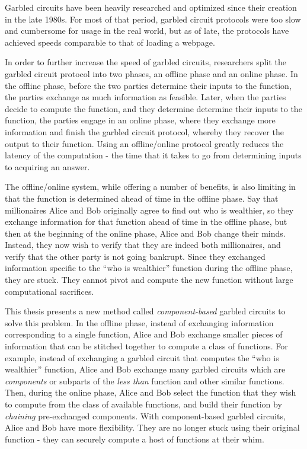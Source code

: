 Garbled circuits have been heavily researched and optimized since their creation in the late 1980s.
For most of that period, garbled circuit protocols were too slow and cumbersome for usage in the real world, but as of late, the protocols have achieved speeds comparable to that of loading a webpage. 

In order to further increase the speed of garbled circuits, researchers split the garbled circuit protocol into two phases, an offline phase and an online phase.
In the offline phase, before the two parties determine their inputs to the function, the parties exchange as much information as feasible. 
Later, when the parties decide to compute the function, and they determine determine their inputs to the function, the parties engage in an online phase, where they exchange more information and finish the garbled circuit protocol, whereby they recover the output to their function.
Using an offline/online protocol greatly reduces the latency of the computation - the time that it takes to go from determining inputs to acquiring an answer.

The offline/online system, while offering a number of benefits, is also limiting in that the function is determined ahead of time in the offline phase.
Say that millionaires Alice and Bob originally agree to find out who is wealthier, so they exchange information for that function ahead of time in the offline phase, but then at the beginning of the online phase, Alice and Bob change their minds. 
Instead, they now wish to verify that they are indeed both millionaires, and verify that the other party is not going bankrupt.
Since they exchanged information specific to the ``who is wealthier'' function during the offline phase, they are stuck. 
They cannot pivot and compute the new function without large computational sacrifices.

This thesis presents a new method called \textit{component-based} garbled circuits to solve this problem.
In the offline phase, instead of exchanging information corresponding to a single function, Alice and Bob exchange smaller pieces of information that can be stitched together to compute a class of functions.
For example, instead of exchanging a garbled circuit that computes the ``who is wealthier'' function, Alice and Bob exchange many garbled circuits which are \textit{components} or subparts of the \textit{less than} function and other similar functions.
Then, during the online phase, Alice and Bob select the function that they wish to compute from the class of available functions, and build their function by \textit{chaining} pre-exchanged components.
With component-based garbled circuits, Alice and Bob have more flexibility. 
They are no longer stuck using their original function - they can securely compute a host of functions at their whim. 

